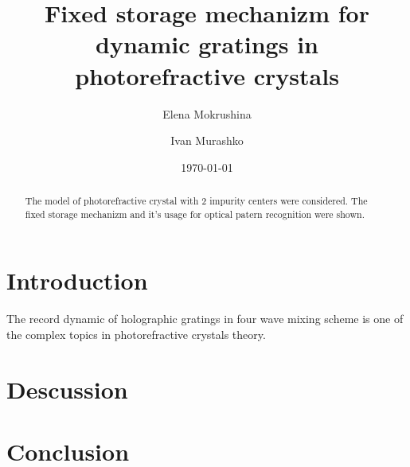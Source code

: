 




\title{Fixed storage mechanizm for dynamic gratings in photorefractive
  crystals}

\author{Elena Mokrushina}
\author{Ivan Murashko}%
%

\date{\today}%

\begin{abstract}
The model of photorefractive crystal with 2 impurity centers were
considered. The fixed storage mechanizm and it's usage for optical
patern recognition were shown. 
\end{abstract}

\maketitle

\section{Introduction}
The record dynamic of holographic gratings in four wave mixing scheme 
is one of the complex topics in photorefractive crystals theory.





\section{Descussion}

\section{Conclusion}




